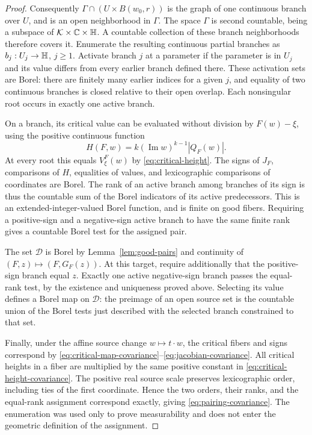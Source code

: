 \begin{proof}
Consequently $\Gamma\cap(U\times B(w_0,r))$ is the graph of one
continuous branch over $U$, and is an open neighborhood in $\Gamma$.
The space $\Gamma$ is second countable, being a subspace of
$\mathcal K\times\mathbb C\times\mathbb H$.  A countable collection of these branch
neighborhoods therefore covers it.  Enumerate the resulting continuous
partial branches as $b_j:U_j\to\mathbb H$, $j\ge1$.
Activate branch $j$ at a parameter if the parameter is in $U_j$ and its
value differs from every earlier branch defined there.  These activation
sets are Borel: there are finitely many earlier indices for a given $j$,
and equality of two continuous branches is closed relative to their
open overlap.  Each nonsingular root occurs in exactly one active branch.

On a branch, its critical value can be evaluated without division by
$F(w)-\xi$, using the positive continuous function
\[
 H(F,w)=k(\operatorname{Im}w)^{k-1}|Q_F(w)|.
\]
At every root this equals $V^F_\xi(w)$ by
\eqref{eq:critical-height}.  The signs of $J_F$, comparisons of $H$,
equalities of values, and lexicographic comparisons of coordinates are
Borel.  The rank of an active branch among branches of its sign is thus
the countable sum of the Borel indicators of its active predecessors.
This is an extended-integer-valued Borel function, and is finite on good
fibers.  Requiring a positive-sign and a negative-sign active branch to
have the same finite rank gives a countable Borel test for the assigned
pair.

The set $\mathcal D$ is Borel by Lemma~\ref{lem:good-pairs} and continuity
of $(F,z)\mapsto(F,G_F(z))$.  At this target, require additionally that
the positive-sign branch equal $z$.  Exactly one active negative-sign
branch passes the equal-rank test, by the existence and uniqueness proved
above.  Selecting its value defines a Borel map on $\mathcal D$: the
preimage of an open source set is the countable union of the Borel tests
just described with the selected branch constrained to that set.

Finally, under the affine source change $w\mapsto t\cdot w$, the critical
fibers and signs correspond by
\eqref{eq:critical-map-covariance}--\eqref{eq:jacobian-covariance}.
All critical heights in a fiber are multiplied by the same positive
constant in \eqref{eq:critical-height-covariance}.  The positive real
source scale preserves lexicographic order, including ties of the first
coordinate.  Hence the two orders, their ranks, and the equal-rank
assignment correspond exactly, giving \eqref{eq:pairing-covariance}.
The enumeration was used only to prove measurability and does not enter
the geometric definition of the assignment.
\end{proof}

